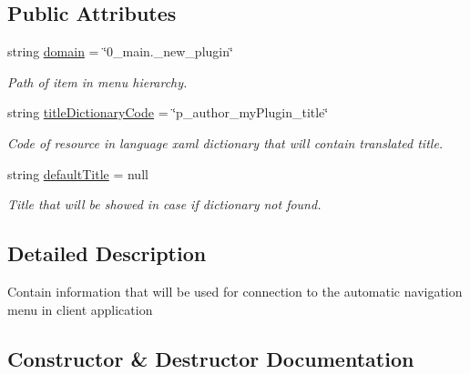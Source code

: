\subsection*{Public Attributes}
\begin{DoxyCompactItemize}
\item 
string \mbox{\hyperlink{class_wpf_handler_1_1_plugins_1_1_menu_item_meta_a029f2a5b3bfe5165d6e00ae76afed48e}{domain}} = \char`\"{}0\+\_\+main.\+\_\+new\+\_\+plugin\char`\"{}
\begin{DoxyCompactList}\small\item\em Path of item in menu hierarchy. \end{DoxyCompactList}\item 
string \mbox{\hyperlink{class_wpf_handler_1_1_plugins_1_1_menu_item_meta_ad86b56cff5215164499143cf088c2bf8}{title\+Dictionary\+Code}} = \char`\"{}p\+\_\+author\+\_\+my\+Plugin\+\_\+title\char`\"{}
\begin{DoxyCompactList}\small\item\em Code of resource in language xaml dictionary that will contain translated title. \end{DoxyCompactList}\item 
string \mbox{\hyperlink{class_wpf_handler_1_1_plugins_1_1_menu_item_meta_a8071dad94e312ee2c0038e7c1689df23}{default\+Title}} = null
\begin{DoxyCompactList}\small\item\em Title that will be showed in case if dictionary not found. \end{DoxyCompactList}\end{DoxyCompactItemize}


\subsection{Detailed Description}
Contain information that will be used for connection to the automatic navigation menu in client application 



\subsection{Constructor \& Destructor Documentation}
\mbox{\label{class_wpf_handler_1_1_plugins_1_1_menu_item_meta_aa4fb81675356848e0e44b87cbfb6b76b}} 
